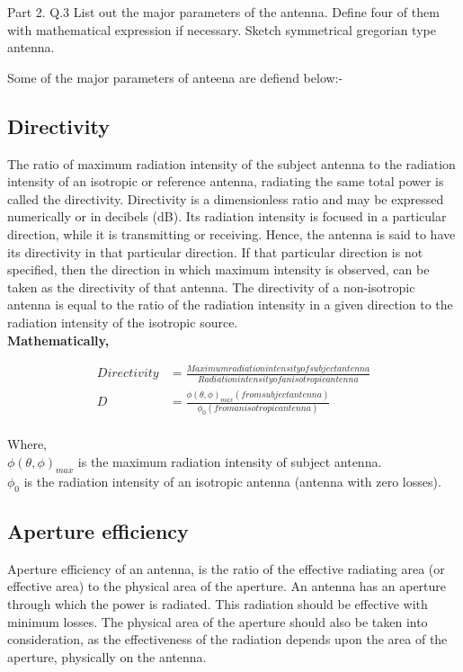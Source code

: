 \documentclass[a4paper,12pt]{article}
\begin{document}

\begin{Q}
    {
        Part 2. Q.3 List out the major parameters of the antenna. Define four of them with mathematical expression if necessary.
        Sketch symmetrical gregorian type antenna.
    }
\end{Q}

\begin{A}
    {
        Some of the major parameters of anteena are defiend below:-


\subsection{Directivity}
The ratio of maximum radiation intensity of the subject antenna to the radiation intensity of an isotropic or reference antenna, 
radiating the same total power is called the directivity.
Directivity is a dimensionless ratio and may be expressed numerically or in decibels (dB).
Its radiation intensity is focused in a particular direction, while it is transmitting or receiving. 
Hence, the antenna is said to have its directivity in that particular direction.
If that particular direction is not specified, then the direction in which maximum intensity is observed,
 can be taken as the directivity of that antenna.
 The directivity of a non-isotropic antenna is equal to the ratio of the radiation intensity in a given direction to the radiation intensity of the isotropic source.\\
 
 \textbf{Mathematically,}

    \begin{align*}
Directivity &=  \frac{Maximum radiation intensity of subject antenna}{Radiation intensity of an isotropic antenna}\\
D &=  \frac{\phi(\theta,\phi)_{max}(from  subject antenna)} {\phi_{0}(from  an isotropic antenna) }\\
    \end{align*}

Where,\\

\({\phi(\theta,\phi)_{max}}\) is the  maximum radiation intensity of subject antenna.\\

\({\phi_{0}}\)  is the radiation intensity of an isotropic antenna (antenna with zero losses).




\subsection{Aperture efficiency}
Aperture efficiency of an antenna, is the ratio of the effective radiating area (or effective area) to the physical area of the aperture.
An antenna has an aperture through which the power is radiated. This radiation should be effective with minimum losses. 
The physical area of the aperture should also be taken into consideration,
 as the effectiveness of the radiation depends upon the area of the aperture, physically on the antenna.\\

}
\end{A}
\end{document}
